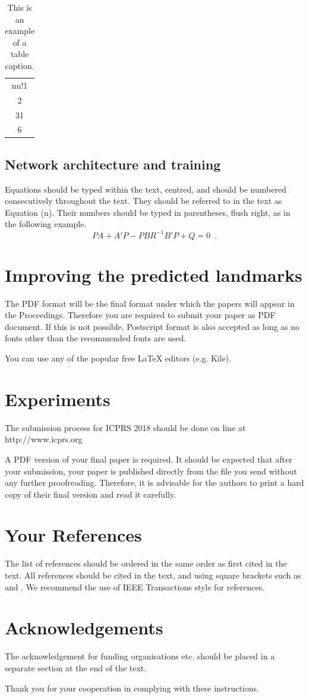 \documentclass[10pt]{article}
\begin{document}
\begin{table}[h]
\begin{center}

\begin{tabular}{c}
nn!1 \\
2 \\
31 \\
6 \\
\end{tabular}
\end{center}
\caption{\label{tab1}This is an example of a table caption.}
\end{table}

\subsection{Network architecture and training}
Equations should be typed within the text, centred, and should
be numbered consecutively throughout the text. They should
be referred to in the text as Equation (n). Their numbers
should be typed in parentheses, flush right, as in the following
example.
\begin{equation}
	    PA + A'P - PBR^{-1}B'P + Q  =  0 \enspace.
\end{equation}

\section{Improving the predicted landmarks}
The PDF format will be the final format under which the
papers will appear in the Proceedings. Therefore you are
required to submit your paper as PDF document. If this is not
possible, Postscript format is also accepted as long as no fonts
other than the recommended fonts are used.

You can use any of the popular free LaTeX editors (e.g. Kile).

\section{Experiments}
The submission process for ICPRS 2018 should be done on
line at http://www.icprs.org

A PDF version of your final paper is required. It should
be expected that after your submission, your paper is
published directly from the file you send without any further
proofreading. Therefore, it is advisable for the authors to
print a hard copy of their final version and read it carefully.

\section{Your References}
The list of references should be ordered in the same order as
first cited in the text. All references should be cited in the
text, and using square brackets such as \cite{ref01} and \cite{ref01,ref02}. We
recommend the use of IEEE Transactions style for references.

\section*{Acknowledgements}
The acknowledgement for funding organisations etc. should
be placed in a separate section at the end of the text.



Thank you for your cooperation in complying with these
instructions.



\end{document}
